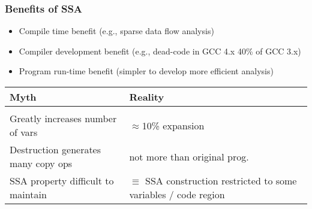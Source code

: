 \begin{frame}
\frametitle{Benefits of SSA}
\begin{itemize}
\item Compile time benefit (e.g., sparse data flow analysis)
\item Compiler development benefit (e.g., dead-code in GCC 4.x 40\% of GCC 3.x)
\item Program run-time benefit (simpler to develop more efficient analysis)
\end{itemize}
\begin{center}
\small
\begin{tabular}{p{}@{\kern.1\textwidth}p{}}
  \hfil Myth\hfil & \hfil Reality \hfil \\[1ex] \hline \\[-2ex]
Greatly increases number of vars & $\approx$10\% expansion\\ [1ex]
Destruction generates many copy ops & not more than original prog. \\ [1ex]
SSA property difficult to maintain & $\equiv$ SSA construction restricted to some variables / code region 
\end{tabular}
\end{center}
\end{frame}


